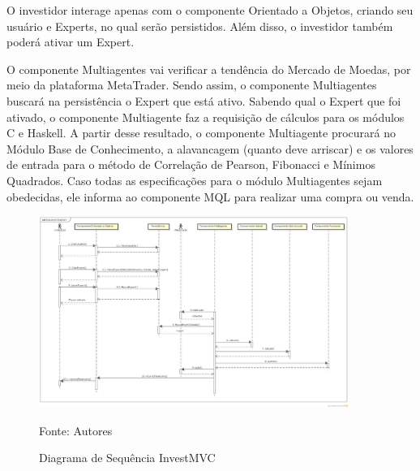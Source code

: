 O investidor interage apenas com o componente Orientado a Objetos, criando seu usuário e Experts, no qual serão persistidos. Além disso, o investidor também poderá ativar um Expert.

O componente Multiagentes vai verificar a tendência do Mercado de Moedas, por meio da plataforma MetaTrader. Sendo assim, o componente Multiagentes buscará na persistência o Expert que está ativo. Sabendo qual o Expert que foi ativado, o componente Multiagente faz a requisição de cálculos para os módulos C e Haskell. A partir desse resultado, o componente Multiagente procurará no Módulo Base de Conhecimento, a alavancagem (quanto deve arriscar) e os valores de entrada para o método de Correlação de Pearson, Fibonacci e Mínimos Quadrados. Caso todas as especificações para o módulo Multiagentes sejam obedecidas, ele informa ao componente MQL para realizar uma compra ou venda.

\begin{figure}[htp]
\centering
\includegraphics[width=0.9\textwidth]{figuras/sequencia}
\caption{Diagrama de Sequência InvestMVC}{Fonte: Autores} 
\label{sequencia}
\end{figure}
